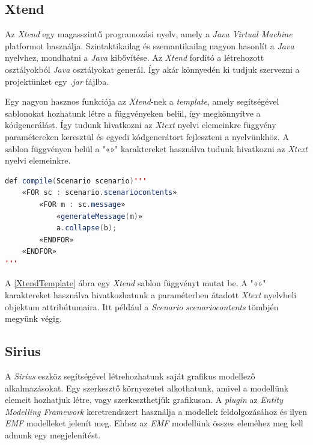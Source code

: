 \subsection{Xtend}

Az \textit{Xtend} \cite{Xtend} egy magasszintű programozási nyelv, amely a \textit{Java Virtual Machine} platformot használja.
Szintaktikailag és szemantikailag nagyon hasonlít a \textit{Java} nyelvhez, mondhatni a \textit{Java} kibővítése.
Az \textit{Xtend} fordító a létrehozott osztályokból \textit{Java} osztályokat generál.
Így akár könnyedén ki tudjuk szervezni a projektünket egy \textit{.jar} fájlba.

Egy nagyon hasznos funkciója az \textit{Xtend}-nek a \textit{template}, amely segítségével sablonokat hozhatunk létre a függvényeken belül, így megkönnyítve a kódgenerálást.
Így tudunk hivatkozni az \textit{Xtext} nyelvi elemeinkre függvény paramétereken keresztül és egyedi kódgenerátort fejleszteni a nyelvünkhöz.
A sablon függvényen belül a "«»" karaktereket használva tudunk hivatkozni az \textit{Xtext} nyelvi elemeinkre.

\begin{lstlisting}[language=java, frame=single, float=ht!, caption={\textit{Xtend template.}},captionpos=b, label=XtendTemplate]
def compile(Scenario scenario)'''
	«FOR sc : scenario.scenariocontents»
		«FOR m : sc.message»
			«generateMessage(m)»
			a.collapse(b);
		«ENDFOR»
	«ENDFOR»
'''
\end{lstlisting}

A \ref{XtendTemplate} ábra egy \textit{Xtend} sablon függvényt mutat be.
A "«»" karaktereket használva hivatkozhatunk a paraméterben átadott \textit{Xtext} nyelvbeli objektum attribútumaira.
Itt például a \textit{Scenario} \textit{scenariocontents} tömbjén megyünk végig.

\subsection{Sirius}

A \textit{Sirius} \cite{Sirius} eszköz segítségével létrehozhatunk saját grafikus modellező alkalmazásokat.
Egy szerkesztő környezetet alkothatunk, amivel a modellünk elemeit hozhatjuk létre, vagy szerkeszthetjük grafikusan.
A \textit{plugin} az \textit{Entity Modelling Framework} \cite{EMF} keretrendszert használja a modellek feldolgozásához és ilyen \textit{EMF} modelleket jelenít meg.
Ehhez az \textit{EMF} modellünk összes eleméhez meg kell adnunk egy megjelenítést.

